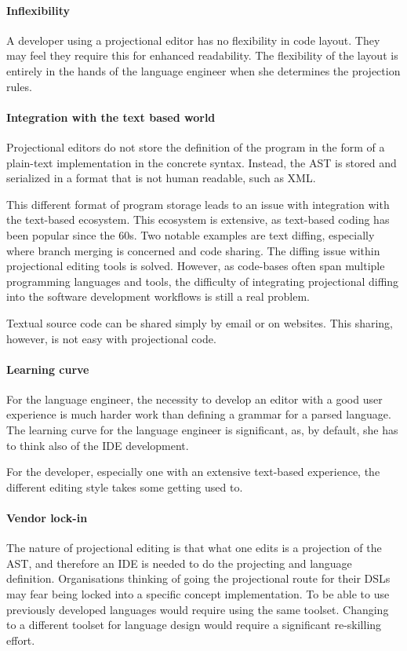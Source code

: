 \paragraph{Inflexibility}
A developer using a projectional editor has no flexibility in code layout. They may feel they require this for enhanced readability.
The flexibility of the layout is entirely in the hands of the language engineer when she determines the projection rules.

\paragraph{Integration with the text based world}
Projectional editors do not store the definition of the program in the form of a plain-text implementation in the concrete syntax.
Instead, the AST is stored and serialized in a format that is not human readable, such as XML.

This different format of program storage leads to an issue with integration with the text-based ecosystem.
This ecosystem is extensive, as text-based coding has been popular since the 60s.
Two notable examples are text diffing, especially where branch merging is concerned and code sharing.
The diffing issue within projectional editing tools is solved.
However, as code-bases often span multiple programming languages and tools, the difficulty of integrating projectional diffing into the software development workflows is still a real problem.

Textual source code can be shared simply by email or on websites. 
This sharing, however, is not easy with projectional code.

\paragraph{Learning curve}
For the language engineer, the necessity to develop an editor with a good user experience is much harder work than defining a grammar for a parsed language.
The learning curve for the language engineer is significant, as, by default, she has to think also of the IDE development.

For the developer, especially one with an extensive text-based experience, the different editing style takes some getting used to.

\paragraph{Vendor lock-in}
The nature of projectional editing is that what one edits is a projection of the AST, and therefore an IDE is needed to do the projecting and language definition.
Organisations thinking of going the projectional route for their DSLs may fear being locked into a specific concept implementation.
To be able to use previously developed languages would require using the same toolset.
Changing to a different toolset for language design would require a significant re-skilling effort.